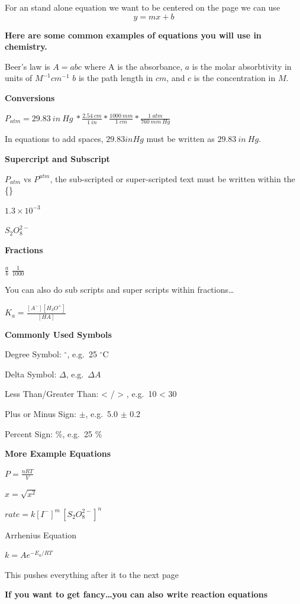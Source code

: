 \documentclass[
]{article}
\begin{document}
For an stand alone equation we want to be centered on the page we can
use \[ y = mx + b \]

\textbf{Here are some common examples of equations you will use in
chemistry.}

Beer's law is \(A = a b c\) where A is the absorbance, \(a\) is the
molar absorbtivity in units of \(M^{-1} cm^{-1}\) \(b\) is the path
length in \(cm\), and \(c\) is the concentration in \(M\).

\textbf{Conversions}

\(P_{atm} = 29.83\: in\: Hg\: * \frac{2.54\: cm}{1\: in} * \frac{1000\: mm}{1\: cm} * \frac{1\: atm}{760\: mm\: Hg}\)

In equations to add spaces, \(29.83 in Hg\) must be written as
\(29.83\: in \: Hg\).

\textbf{Supercript and Subscript}

\(P_{atm}\) vs \(P^{atm}\), the sub-scripted or super-scripted text must
be written within the \{\}

\(1.3 \times 10^{-3}\)

\(S_{2}O_{8}^{2-}\)

\textbf{Fractions}

\(\frac{a}{b}\) \(\frac{1}{1000}\)

You can also do sub scripts and super scripts within fractions\ldots{}

\(K_{a} = \frac{[A^{-}][H_{3}O^{+}]}{[HA]}\)

\textbf{Commonly Used Symbols}

Degree Symbol: \(^\circ\), e.g.~25 \(^\circ\)C

Delta Symbol: \(\Delta\), e.g.~\(\Delta{A}\)

Less Than/Greater Than: \textless{} / \textgreater{} , e.g.~10
\textless{} 30

Plus or Minus Sign: \(\pm\), e.g.~5.0 \(\pm\) 0.2

Percent Sign: \%, e.g.~25 \%

\textbf{More Example Equations}

\(P = \frac{nRT}{V}\)

\(x = \sqrt{x^{2}}\)

\(rate = k[I^{-}]^{m}\,[S_{2}O_{8}^{2-}]^{n}\)

Arrhenius Equation

\(k = Ae^{-E_{a}/RT}\)

\clearpage

This pushes everything after it to the next page

\textbf{If you want to get fancy\ldots you can also write reaction
equations}
\end{document}
